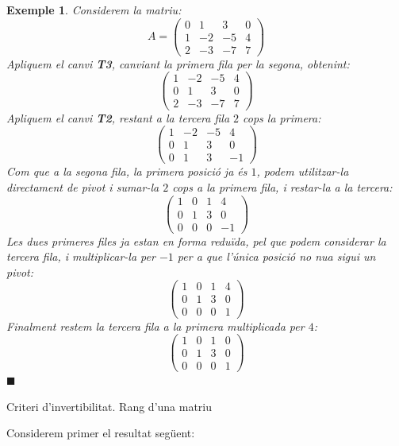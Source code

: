 \documentclass[
  11pt,
]{book}
\makeatletter
\numberwithin{dummy}{section}
\theoremstyle{maincolornumbox}
\theoremstyle{blacknumex}
\newtheorem{exampleT}{Exemple}[chapter]
\theoremstyle{blacknumbox}
\theoremstyle{maincolornum}
\newenvironment{example}{\begin{exampleT}}{\hfill{\tiny\ensuremath{\blacksquare}}\end{exampleT}}
\renewcommand{\section}{\@startsection{section}{1}{\z@}
{-4ex \@plus -1ex \@minus -.4ex}
{1ex \@plus.2ex }
{\normalfont\large\sffamily\bfseries}}
\makeatother
\begin{document}
\begin{example}
Considerem la matriu: \[A=\begin{pmatrix}
    0 & 1 & 3 & 0 \\  1 & -2 & -5 & 4\\ 2 & -3 & -7 & 7
    \end{pmatrix}\] Apliquem el canvi \textbf{T3}, canviant la primera fila per
la segona, obtenint: \[\begin{pmatrix}
    1 & -2 & -5 & 4\\0 & 1 & 3 & 0 \\   2 & -3 & -7 & 7
    \end{pmatrix}\] Apliquem el canvi \textbf{T2}, restant a la tercera fila \(2\)
cops la primera: \[\begin{pmatrix}
    1 & -2 & -5 & 4\\0 & 1 & 3 & 0 \\   0 & 1 & 3 & -1
    \end{pmatrix}\] Com que a la segona fila, la primera posició ja és \(1\),
podem utilitzar-la directament de pivot i sumar-la \(2\) cops a la primera
fila, i restar-la a la tercera: \[\begin{pmatrix}
    1 & 0 & 1 & 4\\0 & 1 & 3 & 0 \\   0 & 0 & 0 & -1
    \end{pmatrix}\] Les dues primeres files ja estan en forma reduïda, pel
que podem considerar la tercera fila, i multiplicar-la per \(-1\) per a
que l'única posició no nua sigui un pivot: \[\begin{pmatrix}
    1 & 0 & 1 & 4\\0 & 1 & 3 & 0 \\   0 & 0 & 0 & 1
    \end{pmatrix}\] Finalment restem la tercera fila a la primera
multiplicada per \(4\): \[\begin{pmatrix}
    1 & 0 & 1 & 0\\0 & 1 & 3 & 0 \\   0 & 0 & 0 & 1
    \end{pmatrix}\]
\end{example}

\section{Criteri d'invertibilitat. Rang d'una matriu}\label{criteri-dinvertibilitat.-rang-duna-matriu}

Considerem primer el resultat següent:
\end{document}

